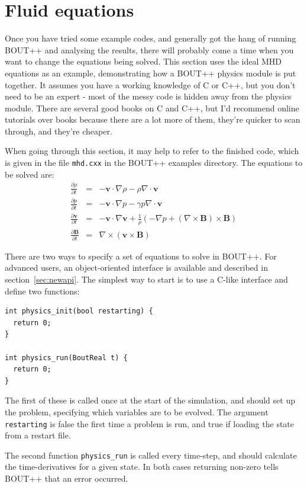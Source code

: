 \documentclass[12pt]{article}
\newcommand{\code}[1]{\texttt{#1}}
\newcommand{\deriv}[2]{\ensuremath{\frac{\partial #1}{\partial #2}}}
\begin{document}
\section{Fluid equations}
\label{sec:equations}

Once you have tried some example codes, and generally got the hang of running
BOUT++ and analysing the results, there will probably come a time when
you want to change the equations being solved.
This section uses the ideal MHD equations as an example, demonstrating how
a BOUT++ physics module is put together. It assumes you have a working knowledge
of C or C++, but you don't need to be an expert - most of the messy code is hidden away
from the physics module. There are several good books on C and C++, but I'd recommend online
tutorials over books because there are a lot more of them, they're quicker to scan through,
and they're cheaper.

When going through this section, it may help to refer to the finished code, which
is given in the file \texttt{mhd.cxx} in the BOUT++ examples directory. The equations to be solved are:
\begin{eqnarray*}
\deriv{\rho}{t} &=& -\mathbf{v}\cdot\nabla\rho - \rho\nabla\cdot\mathbf{v} \\
\deriv{p}{t} &=& -\mathbf{v}\cdot\nabla p - \gamma p\nabla\cdot\mathbf{v} \\
\deriv{\mathbf{v}}{t} &=& -\mathbf{v}\cdot\nabla\mathbf{v} + \frac{1}{\rho}\left(-\nabla p + \left(\nabla\times\mathbf{B}\right)\times\mathbf{B}\right) \\
\deriv{\mathbf{B}}{t} &=& \nabla\times\left(\mathbf{v}\times\mathbf{B}\right)
\end{eqnarray*}

There are two ways to specify a set of equations to solve in BOUT++. For advanced users, an object-oriented interface is available and described in section~\ref{sec:newapi}. The simplest way to start is to
use a C-like interface and define two functions:
\begin{lstlisting}
int physics_init(bool restarting) {
  return 0;
}

int physics_run(BoutReal t) {
  return 0;
}
\end{lstlisting}
The first of these is called once at the start of the simulation, and should set up the problem,
specifying which variables are to be evolved. The argument \code{restarting} is false the first time a problem is run, and true if loading the state from a
restart file.

The second function \code{physics\_run} is called every time-step,
and should calculate the time-derivatives for a given state. In both cases returning non-zero
tells BOUT++ that an error occurred.
\end{document}
